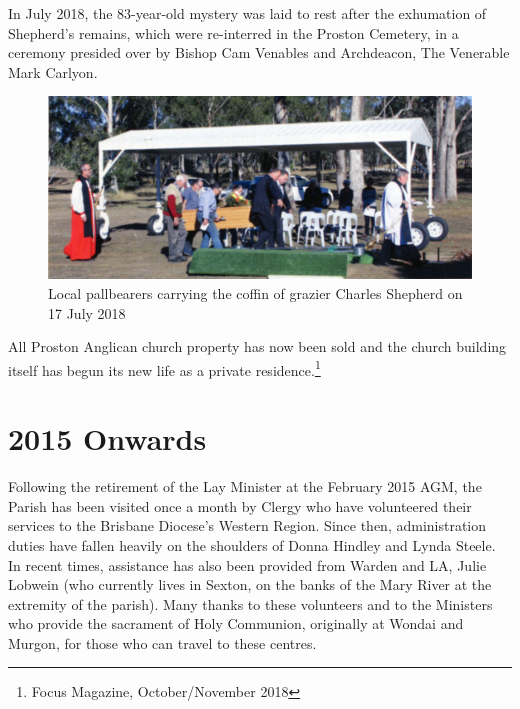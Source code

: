 In July 2018, the 83-year-old mystery was laid to rest after the exhumation of Shepherd's remains, which were re-interred in the Proston Cemetery, in a ceremony presided over by Bishop Cam Venables and Archdeacon, The Venerable Mark Carlyon.









\begin{figure}[!htb]
\begin{center}
\includegraphics[width=1.\textwidth,center]{../images/charlesShepherd.jpg}
\caption{Local pallbearers carrying the coffin of grazier Charles Shepherd on 17 July 2018}
\end{center}
\end{figure}




All Proston Anglican church property has now been sold and the church building itself has begun its new life as a private residence.\footnote{Focus Magazine, October/November 2018}


\section{2015 Onwards}



Following the retirement of the Lay Minister at the February 2015 AGM, the Parish has been visited once a month by Clergy who have volunteered their services to the Brisbane Diocese's Western Region. Since then, administration duties have fallen heavily on the shoulders of Donna Hindley and Lynda Steele. In recent times, assistance has also been provided from Warden and LA, Julie Lobwein (who currently lives in Sexton, on the banks of the Mary River at the extremity of the parish). Many thanks to these volunteers and to the Ministers who provide the sacrament of Holy Communion, originally at Wondai and Murgon, for those who can travel to these centres.



